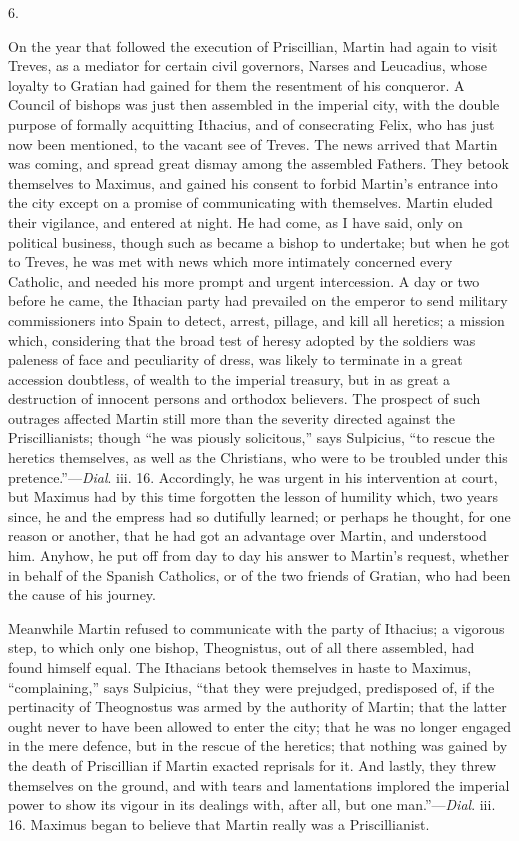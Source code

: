 6.

On the year that followed the execution of Priscillian, Martin had
again to visit Treves, as a mediator for certain civil governors,
Narses and Leucadius, whose loyalty to Gratian had gained for them the
resentment of his conqueror. A Council of bishops was just then
assembled in the imperial city, with the double purpose of formally
acquitting Ithacius, and of consecrating Felix, who has just now been
mentioned, to the vacant see of Treves. The news arrived that Martin
was coming, and spread great dismay among the assembled Fathers. They
betook themselves to Maximus, and gained his consent to forbid Martin's
entrance into the city except on a promise of communicating with
themselves. Martin eluded their vigilance, and entered at night. He
had come, as I have said, only on political business, though such as
became a bishop to undertake; but when he got to Treves, he was
met with news which more intimately concerned every Catholic, and
needed his more prompt and urgent intercession. A day or two before he
came, the Ithacian party had prevailed on the emperor to send military
commissioners into Spain to detect, arrest, pillage, and kill all
heretics; a mission which, considering that the broad test of heresy
adopted by the soldiers was paleness of face and peculiarity of dress,
was likely to terminate in a great accession doubtless, of wealth to
the imperial treasury, but in as great a destruction of innocent
persons and orthodox believers. The prospect of such outrages affected
Martin still more than the severity directed against the
Priscillianists; though ``he was piously solicitous,'' says
Sulpicius, ``to rescue the heretics themselves, as well as the
Christians, who were to be troubled under this pretence.''—\emph{Dial}.
iii. 16. Accordingly, he was urgent in his intervention at court, but
Maximus had by this time forgotten the lesson of humility which, two
years since, he and the empress had so dutifully learned; or perhaps
he thought, for one reason or another, that he had got an advantage
over Martin, and understood him. Anyhow, he put off from day to day
his answer to Martin's request, whether in behalf of the Spanish
Catholics, or of the two friends of Gratian, who had been the cause of
his journey.

Meanwhile Martin refused to communicate with the party of Ithacius;
a vigorous step, to which only one bishop, Theognistus, out of all
there assembled, had found himself equal. The Ithacians betook
themselves in haste to Maximus, ``complaining,'' says
Sulpicius, ``that they were prejudged, predisposed of, if the
pertinacity of Theognostus was armed by the authority of Martin; that
the latter ought never to have been allowed to enter the city;
that he was no longer engaged in the mere defence, but in the rescue
of the heretics; that nothing was gained by the death of Priscillian
if Martin exacted reprisals for it. And lastly, they threw themselves
on the ground, and with tears and lamentations implored the imperial
power to show its vigour in its dealings with, after all, but one
man.''—\emph{Dial}. iii. 16. Maximus began to believe that
Martin really was a Priscillianist.

